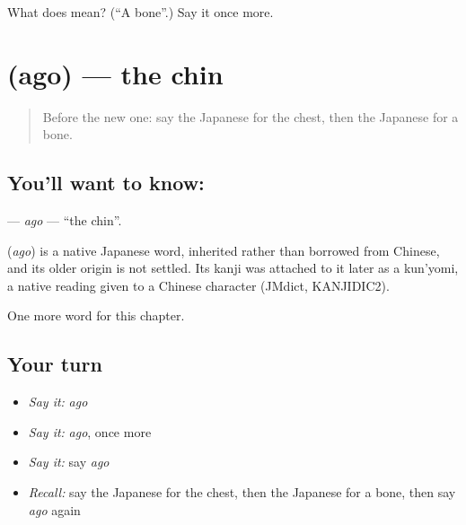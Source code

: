 \begin{tcolorbox}[breakable,colback=teal!4,colframe=teal!35!black,title={Before you move on}]
What does  mean? (\textquotedblleft{}A bone\textquotedblright{}.) Say it once more.
\end{tcolorbox}
\section[\texorpdfstring{\ja{あご} (ago)}{あご (ago)}]{ (ago) — the chin}

\label{lesson:JA-C21-ago}



\begin{quote}
Before the new one: say the Japanese for the chest, then the Japanese for a bone.
\end{quote}

\subsection*{You'll want to know: }
\textbf{} — \emph{ago} — \textquotedblleft{}the chin\textquotedblright{}.

\begin{cousinweb}
\textbf{} (\emph{ago}) is a native Japanese word, inherited rather than borrowed from Chinese, and its older origin is not settled. Its kanji was attached to it later as a kun'yomi, a native reading given to a Chinese character (JMdict, KANJIDIC2).
\end{cousinweb}

\begin{grammarlens}[title={What you've built}]
One more word for this chapter.
\end{grammarlens}

\subsection*{Your turn}
\begin{itemize}
\raggedright
  \item \emph{Say it:} \emph{ago}
  \item \emph{Say it:} \emph{ago}, once more
  \item \emph{Say it:} say \emph{ago}
  \item \emph{Recall:} say the Japanese for the chest, then the Japanese for a bone, then say \emph{ago} again
\end{itemize}

